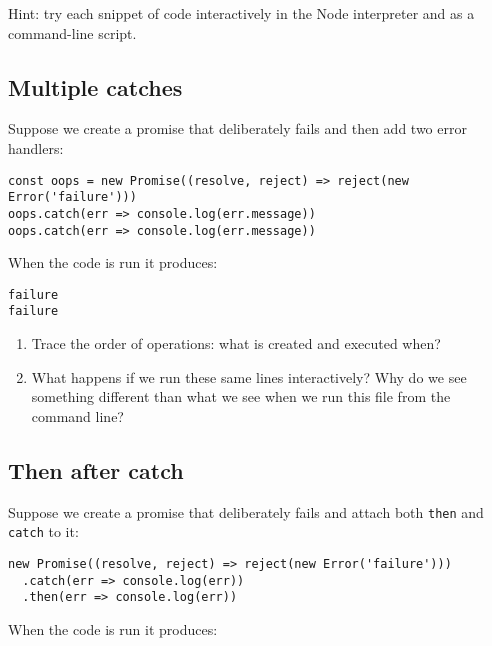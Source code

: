\documentclass[krantzl]{krantz}
\begin{document}
Hint: try each snippet of code interactively in the Node interpreter and as a command-line script.

\subsection*{Multiple catches}


Suppose we create a promise that deliberately fails and then add two error handlers:


\begin{lstlisting}[frame=single,frameround=tttt]
const oops = new Promise((resolve, reject) => reject(new Error('failure')))
oops.catch(err => console.log(err.message))
oops.catch(err => console.log(err.message))
\end{lstlisting}



\noindent When the code is run it produces:


\begin{lstlisting}[frame=single,frameround=tttt]
failure
failure
\end{lstlisting}


\begin{enumerate}

\item Trace the order of operations: what is created and executed when?

\item What happens if we run these same lines interactively?
    Why do we see something different than what we see when we run this file from the command line?

\end{enumerate}

\subsection*{Then after catch}


Suppose we create a promise that deliberately fails
and attach both \texttt{then} and \texttt{catch} to it:


\begin{lstlisting}[frame=single,frameround=tttt]
new Promise((resolve, reject) => reject(new Error('failure')))
  .catch(err => console.log(err))
  .then(err => console.log(err))
\end{lstlisting}



\noindent When the code is run it produces:
\end{document}
